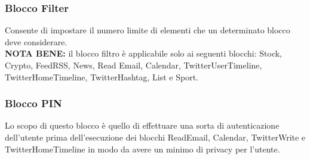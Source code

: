 \subsubsection{Blocco Filter}
Consente di impostare il numero limite di elementi che un determinato blocco deve considerare. \\
\textbf{NOTA BENE:} il blocco filtro è applicabile solo ai seguenti blocchi: Stock, Crypto, FeedRSS, News, Read Email, Calendar, TwitterUserTimeline, TwitterHomeTimeline, TwitterHashtag, List e Sport.

\subsubsection{Blocco PIN}
Lo scopo di questo blocco è quello di effettuare una sorta di autenticazione dell'utente prima dell'esecuzione dei blocchi ReadEmail, Calendar, TwitterWrite e TwitterHomeTimeline in modo da avere un minimo di privacy per l'utente.
